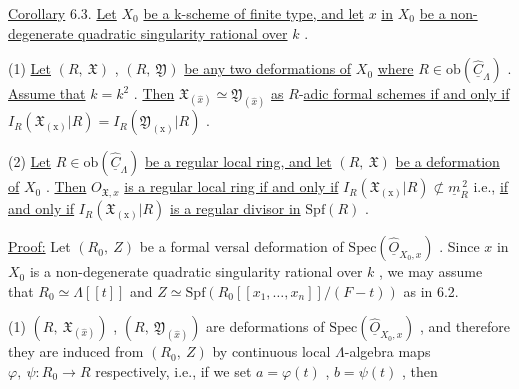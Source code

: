 \underline{Corollary} 6.3.  \underline{Let}  $X_0$  \underline{be a k-scheme of finite type, and let}  $x$  \underline{in}  $X_0$  \underline{be a non-degenerate quadratic singularity rational over}  $k$  .

(1)  \underline{Let}  $(R,\ \mathfrak{X})$ ,  $(R,\ \mathfrak{Y})$  \underline{be any two deformations of}  $X_0$  \underline{where} $R \in \mathrm{ob}(\hat{\underline{C}}_{\Lambda})$  . \underline{Assume that}  $k = k^2$  . \underline{Then}  $\mathfrak{X}_{(\widehat{x})} \simeq \mathfrak{Y}_{(\widehat{x})}$  \underline{as} $R$-\underline{adic formal schemes if and only if}  $I_R(\mathfrak{X}_{(\mathrm{x})}|R) = I_R(\mathfrak{Y}_{(\mathrm{x})}|R)$  .

(2)  \underline{Let}  $R \in \mathrm{ob}(\hat{\underline{C}}_{\Lambda})$  \underline{be a regular local ring, and let}  $(R,\ \mathfrak{X})$  \underline{be a deformation of}  $X_0$  . \underline{Then}  $O_{\mathfrak{X},x}$  \underline{is a regular local ring if and only if} $I_R(\mathfrak{X}_{(\mathrm{x})}|R) \not\subset \underline{m}_R^{\,2}$  i.e., \underline{if and only if}  $I_R(\mathfrak{X}_{(\mathrm{x})}|R)$  \underline{is a regular divisor in} $\mathrm{Spf}(R)$  .

\underline{Proof:}  Let  $(R_0,\ Z)$  be a formal versal deformation of  $\mathrm{Spec}(\hat{\underline{O}}_{X_0,x})$  . Since  $x$ in  $X_0$  is a non-degenerate quadratic singularity rational over  $k$  , we may assume that  $R_0 \simeq \Lambda[[t]]$  and  $Z \simeq \mathrm{Spf}(R_0[[x_1,\dots,x_n]]/(F - t))$  as in 6.2.

(1)  $(R,\ \mathfrak{X}_{(\widehat{x})})$ ,  $(R,\ \mathfrak{Y}_{(\widehat{x})})$  are deformations of  $\mathrm{Spec}(\hat{\underline{O}}_{X_0,x})$  , and therefore they are induced from  $(R_0,\ Z)$  by continuous local $\Lambda$-algebra maps $\varphi,\ \psi : R_0 \rightarrow R$  respectively, i.e., if we set  $a = \varphi(t)$  ,  $b = \psi(t)$  , then

